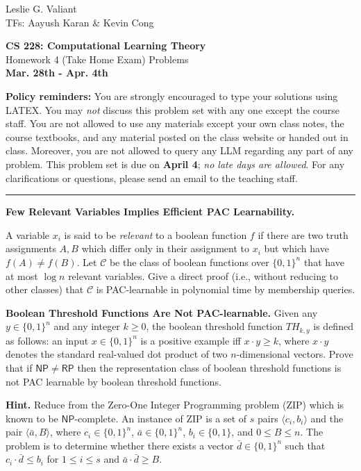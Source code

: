 \documentclass[11pt]{article}
\DeclareMathOperator{\1}{\mathbbm{1}}
\begin{document}
\begin{flushright}
			Leslie G. Valiant \\
			TFs: Aayush Karan \& Kevin Cong
\end{flushright}

\begin{center}
\textbf{CS 228: Computational Learning Theory} \\
Homework 4 (Take Home Exam) Problems\\ \textbf{Mar. 28th - Apr. 4th}
\end{center}

\textbf{Policy reminders:} You are strongly encouraged to type your solutions using LATEX. You may \textit{not} discuss this problem set with any one except the course staff. You are not allowed to use any materials except your own class notes, the course textbooks, and any material posted on the class website or handed out in class. Moreover, you are not allowed to query any LLM regarding any part of any problem. This problem set is due on \textbf{April 4}; \textit{no late days are allowed}. For any clarifications or questions, please send an email to the teaching staff. 


\rule{\linewidth}{0.4pt}


\begin{problem} [10 pts] \textbf{Few Relevant Variables Implies Efficient PAC Learnability.}
    
A variable $x_i$ is said to be \textit{relevant} to a boolean function $f$ if there are two truth assignments $A, B$ which differ only in their assignment to $x_i$ but which have $f(A) \neq f(B)$. Let $\mathcal{C}$ be the class of boolean functions over $\{0,1\}^n$ that have at most $\log n$ relevant variables. Give a direct proof (i.e., without reducing to other classes) that $\mathcal{C}$ is PAC-learnable in polynomial time by membership queries. 


\end{problem}



\begin{problem} [15 pts] \textbf{Boolean Threshold Functions Are Not PAC-learnable.} Given any $y \in \{0,1\}^n$ and any integer $k \geq 0$, the boolean threshold function $TH_{k,y}$ is defined as follows: an input $x \in \{0,1\}^n$ is a positive example iff $x \cdot y \geq k$, where $x \cdot y$ denotes the standard real-valued dot product of two $n$-dimensional vectors. Prove that if $\mathsf{NP} \neq \mathsf{RP}$ then the representation class of boolean threshold functions is not PAC learnable by boolean threshold functions.

\textbf{Hint.} Reduce from the Zero-One Integer Programming problem (ZIP) which is known to be $\mathsf{NP}$-complete. An instance of ZIP is a set of $s$ pairs $\langle c_i, b_i \rangle$ and the pair $\langle \bar{a}, B \rangle$, where $c_i \in \{0,1\}^n$, $\bar{a} \in \{0,1\}^n$, $b_i \in \{0,1\}$, and $0 \leq B \leq n$. The problem is to determine whether there exists a vector $\bar{d} \in \{0,1\}^n$ such that $c_i \cdot \bar{d} \leq b_i$ for $1 \leq i \leq s$ and $\bar{a} \cdot \bar{d} \geq B$.

\end{problem}
\end{document}
